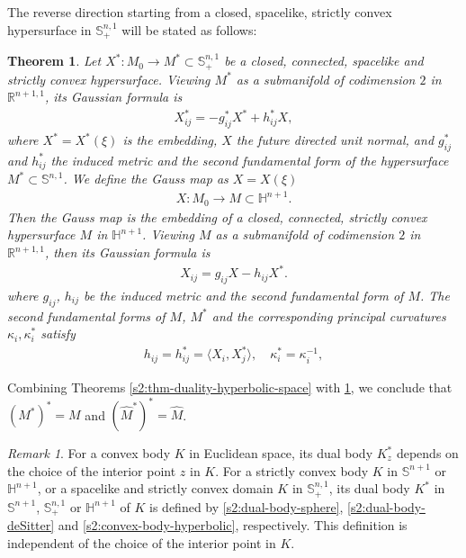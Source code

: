 \documentclass[11pt,reqno]{amsart}
\newtheorem{thm}{Theorem}[section]
\theoremstyle{definition}
\theoremstyle{remark}
\newtheorem{rem}{Remark}
\numberwithin{equation}{section}
\renewcommand{\(}{\left(}
\renewcommand{\)}{\right)}
\renewcommand{\~}{\tilde}
\renewcommand{\-}{\overline}
\renewcommand{\k}{\kappa}
\newcommand{\ra}{\rightarrow}
\begin{document}
The reverse direction starting from a closed, spacelike, strictly convex hypersurface in $\mathbb S^{n,1}_{+}$ will be stated as follows:
\begin{thm}\label{s2:thm-duality-de-Sitter-space}\cite[Theorem 10.4.5]{Gerh06}
	Let $X^\ast :M_0\ra M^\ast \subset \mathbb S_{+}^{n,1}$ be a closed, connected, spacelike and strictly convex hypersurface. Viewing $M^\ast$ as a submanifold of codimension $2$ in $\mathbb R^{n+1,1}$, its Gaussian formula is 
	\begin{align}\label{s2:Gauss-formula-polar-deSitter}
	X^\ast_{ij}=-g^{\ast}_{ij} X^\ast+h^{\ast}_{ij}X,
	\end{align}
	where $X^\ast=X^\ast(\xi)$ is the embedding, $X$ the future directed unit normal, and $g^\ast_{ij}$ and $h^\ast_{ij}$ the induced metric and the second fundamental form of the hypersurface $M^\ast \subset \mathbb S^{n,1}$. We define the Gauss map as $X=X(\xi)$ 
	\begin{align*}
	X: M_0 \ra M \subset \mathbb H^{n+1}.
	\end{align*} 
	Then the Gauss map is the embedding of a closed, connected, strictly convex hypersurface $M$ in $\mathbb H^{n+1}$. Viewing $M$ as a submanifold of codimension $2$ in $\mathbb R^{n+1,1}$, then its Gaussian formula is 
	\begin{align*}
	X_{ij} =g_{ij} X-h_{ij}X^\ast.
	\end{align*}
	where $g_{ij}$, $h_{ij}$ be the induced metric and the second fundamental form of $M$. The second fundamental forms of $M$, $M^\ast$ and the corresponding principal curvatures $\k_i,\k_i^\ast$ satisfy 
	\begin{align}\label{s2:duality-deSitter}
	h_{ij} =h^\ast_{ij}=\langle X_i,X^\ast_j\rangle, \quad 	\k^\ast_i=\k_i^{-1},
	\end{align}	
\end{thm} 
Combining Theorems \ref{s2:thm-duality-hyperbolic-space} with \ref{s2:thm-duality-de-Sitter-space}, we conclude that $(M^\ast)^\ast=M$ and $(\hat{M}^\ast)^\ast=\hat{M}$.

\begin{rem}
	For a convex body $K$ in Euclidean space, its dual body $K_z^\ast$ depends on the choice of the interior point $z$ in $K$. For a strictly convex body $K$ in $\mathbb S^{n+1}$ or $\mathbb H^{n+1}$, or a spacelike and strictly convex domain $K$ in $\mathbb S^{n,1}_{+}$, its dual body $K^\ast$ in $\mathbb S^{n+1}$, $\mathbb S^{n,1}_{+}$ or $\mathbb H^{n+1}$ of $K$ is defined by \eqref{s2:dual-body-sphere}, \eqref{s2:dual-body-deSitter} and \eqref{s2:convex-body-hyperbolic}, respectively. This definition is independent of the choice of the interior point in $K$.
\end{rem} 
\end{document}
